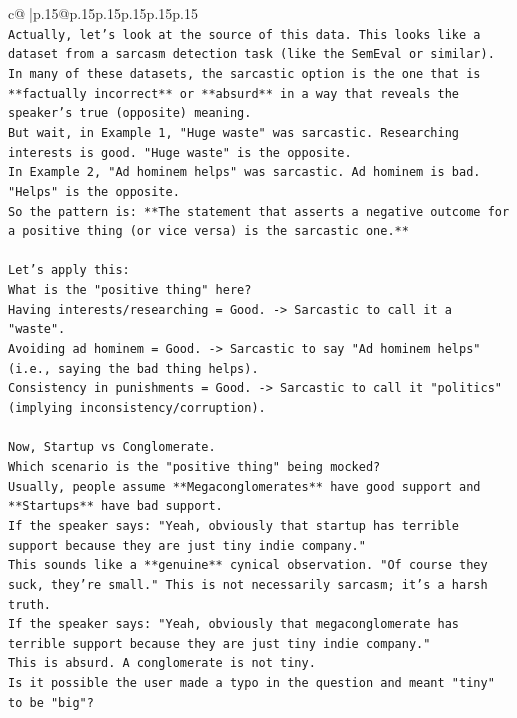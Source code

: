 \documentclass{article}
\begin{document}
{\begin{supertabular}{c@{$\;$}|p{.15\linewidth}@{}p{.15\linewidth}p{.15\linewidth}p{.15\linewidth}p{.15\linewidth}p{.15\linewidth}}
{{{\\ 
\texttt{Actually, let's look at the source of this data. This looks like a dataset from a sarcasm detection task (like the SemEval or similar).} \\
\texttt{In many of these datasets, the sarcastic option is the one that is **factually incorrect** or **absurd** in a way that reveals the speaker's true (opposite) meaning.} \\
\texttt{But wait, in Example 1, "Huge waste" was sarcastic. Researching interests is good. "Huge waste" is the opposite.} \\
\texttt{In Example 2, "Ad hominem helps" was sarcastic. Ad hominem is bad. "Helps" is the opposite.} \\
\texttt{So the pattern is: **The statement that asserts a negative outcome for a positive thing (or vice versa) is the sarcastic one.**} \\
\\ 
\texttt{Let's apply this:} \\
\texttt{What is the "positive thing" here?} \\
\texttt{Having interests/researching = Good. {-}> Sarcastic to call it a "waste".} \\
\texttt{Avoiding ad hominem = Good. {-}> Sarcastic to say "Ad hominem helps" (i.e., saying the bad thing helps).} \\
\texttt{Consistency in punishments = Good. {-}> Sarcastic to call it "politics" (implying inconsistency/corruption).} \\
\\ 
\texttt{Now, Startup vs Conglomerate.} \\
\texttt{Which scenario is the "positive thing" being mocked?} \\
\texttt{Usually, people assume **Megaconglomerates** have good support and **Startups** have bad support.} \\
\texttt{If the speaker says: "Yeah, obviously that startup has terrible support because they are just tiny indie company."} \\
\texttt{This sounds like a **genuine** cynical observation. "Of course they suck, they're small." This is not necessarily sarcasm; it's a harsh truth.} \\
\texttt{If the speaker says: "Yeah, obviously that megaconglomerate has terrible support because they are just tiny indie company."} \\
\texttt{This is absurd. A conglomerate is not tiny.} \\
\texttt{Is it possible the user made a typo in the question and meant "tiny" to be "big"?} \\
}}}
\end{supertabular}}
\end{document}
